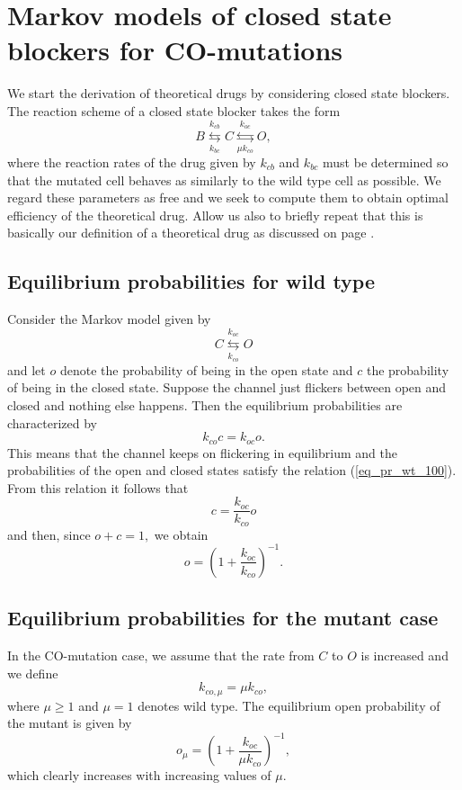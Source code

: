 \section[Closed state blockers for CO-mutations]{Markov models of closed state blockers for CO-mutations}


We start the derivation of theoretical drugs by considering closed state blockers.
The reaction scheme of a closed state blocker takes the form
\begin{equation}
B\underset{k_{bc}}{\overset{k_{cb}}{\leftrightarrows}}C\underset{\mu
k_{co}}{\overset{k_{oc}}{\leftrightarrows}}O, \label{closed_drg}
\end{equation}
where the reaction rates of the drug given by $k_{cb}$ and $k_{bc}$ must be determined
so that the mutated cell behaves as similarly to the wild type cell as possible. We regard these parameters as
free and we seek to compute them to obtain optimal efficiency of the theoretical drug. Allow us also to briefly repeat that this is basically our definition of a theoretical drug as discussed on page \pageref{theoreticaldrugs}.

\subsection{Equilibrium probabilities for wild type \label{eq_pr_wt}}
Consider the Markov model given by%
\[
C\underset{k_{co}}{\overset{k_{oc}}{\leftrightarrows}}O
\]
and let $o$ denote the probability of being in the open state and $c$ the probability of being
in the closed state. Suppose the channel just flickers between open and closed and nothing else happens. Then
the equilibrium probabilities are characterized by%
\begin{equation}
k_{co}c=k_{oc}o. \label{eq_pr_wt_100}
\end{equation}
This means that the channel keeps on flickering in equilibrium and the probabilities of the open and closed states satisfy the relation (\ref{eq_pr_wt_100}). From this relation it follows that
\[
c=\frac{k_{oc}}{k_{co}}o
\]
and then, since $o+c=1,$ we obtain%
\[
o=\left(  1+\frac{k_{oc}}{k_{co}}\right)  ^{-1}.%
\]

\subsection{Equilibrium probabilities for the mutant case}


In the CO-mutation case, we assume that the rate from $C$ to $O$ is increased and
we define%
\begin{equation}
k_{co,\mu}=\mu k_{co}, \label{kcomu}
\end{equation}
where $\mu\geqslant1$ and $\mu=1$ denotes wild type. The equilibrium
open probability of the mutant is given by%
\[
o_\mu=\left(  1+\frac{k_{oc}}{\mu k_{co}}\right)^{-1},
\]
which clearly increases with increasing values of $\mu$.

